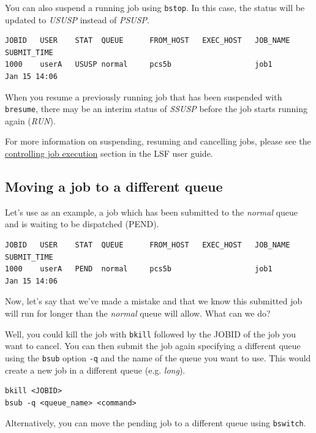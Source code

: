 \documentclass[11pt]{article}
\begin{document}
    You can also suspend a running job using \texttt{bstop}. In this case,
the status will be updated to \textit{USUSP} instead of \textit{PSUSP}.

    \begin{verbatim}
JOBID   USER    STAT  QUEUE      FROM_HOST   EXEC_HOST   JOB_NAME   SUBMIT_TIME
1000    userA   USUSP normal     pcs5b                   job1       Jan 15 14:06
\end{verbatim}

    When you resume a previously running job that has been suspended with
\texttt{bresume}, there may be an interim status of \textit{SSUSP} before
the job starts running again (\textit{RUN}).

For more information on suspending, resuming and cancelling jobs, please
see the
\href{https://www.ibm.com/support/knowledgecenter/en/SSWRJV_10.1.0/lsf_admin_foundations/control_job_exec.html}{controlling
job execution} section in the LSF user guide.

    \subsection{Moving a job to a different
queue}\label{moving-a-job-to-a-different-queue}

Let's use as an example, a job which has been submitted to the
\textit{normal} queue and is waiting to be dispatched (PEND).

    \begin{verbatim}
JOBID   USER    STAT  QUEUE      FROM_HOST   EXEC_HOST   JOB_NAME   SUBMIT_TIME
1000    userA   PEND  normal     pcs5b                   job1       Jan 15 14:06
\end{verbatim}

    Now, let's say that we've made a mistake and that we know this submitted
job will run for longer than the \textit{normal} queue will allow. What
can we do?

Well, you could kill the job with \texttt{bkill} followed by the JOBID
of the job you want to cancel. You can then submit the job again
specifying a different queue using the \texttt{bsub} option \texttt{-q}
and the name of the queue you want to use. This would create a new job
in a different queue (e.g. \textit{long}).

    \begin{verbatim}
bkill <JOBID>
bsub -q <queue_name> <command>
\end{verbatim}

    Alternatively, you can move the pending job to a different queue using
\texttt{bswitch}.
\end{document}
